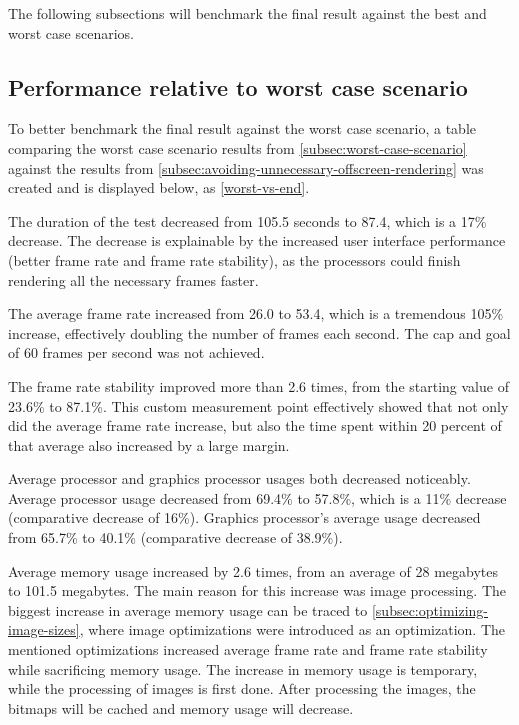 \documentclass[a4paper,12pt]{article}
\begin{document}
The following subsections will benchmark the final result against the best and worst case scenarios.

\subsection{Performance relative to worst case scenario}
\label{subsec:performance-relative-to-worst-case-scenario}
To better benchmark the final result against the worst case scenario, a table comparing the worst case scenario results from \autoref{subsec:worst-case-scenario} against the results from \autoref{subsec:avoiding-unnecessary-offscreen-rendering} was created and is displayed below, as \autoref{worst-vs-end}.

The duration of the test decreased from 105.5 seconds to 87.4, which is a 17\% decrease. The decrease is explainable by the increased user interface performance (better frame rate and frame rate stability), as the processors could finish rendering all the necessary frames faster.

The average frame rate increased from 26.0 to 53.4, which is a tremendous 105\% increase, effectively doubling the number of frames each second. The cap and goal of 60 frames per second was not achieved.

The frame rate stability improved more than 2.6 times, from the starting value of 23.6\% to 87.1\%. This custom measurement point effectively showed that not only did the average frame rate increase, but also the time spent within 20 percent of that average also increased by a large margin.

Average processor and graphics processor usages both decreased noticeably. Average processor usage decreased from 69.4\% to 57.8\%, which is a 11\% decrease (comparative decrease of 16\%). Graphics processor's average usage decreased from 65.7\% to 40.1\% (comparative decrease of 38.9\%).

Average memory usage increased by 2.6 times, from an average of 28 megabytes to 101.5 megabytes. The main reason for this increase was image processing. The biggest increase in average memory usage can be traced to \autoref{subsec:optimizing-image-sizes}, where image optimizations were introduced as an optimization. The mentioned optimizations increased average frame rate and frame rate stability while sacrificing memory usage. The increase in memory usage is temporary, while the processing of images is first done. After processing the images, the bitmaps will be cached and memory usage will decrease.
\end{document}
